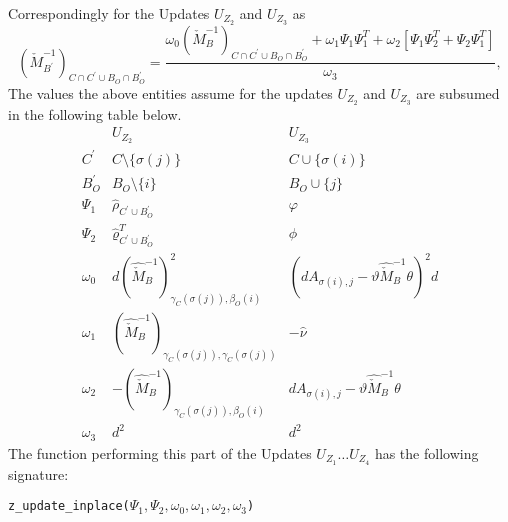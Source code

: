 \documentclass[a4paper]{article}
\begin{document}
Correspondingly for the Updates $U_{Z_{2}}$ and $U_{Z_{3}}$ as 
\begin{equation}
\left(
\check{M}_{B^{\prime}}^{-1}
\right)_{C \cap C^{\prime} \cup B_{O} \cap B_{O}^{\prime}}
=
\frac{
\omega_{0}
\left(
\check{M}_{B}^{-1}
\right)_{C \cap C^{\prime} \cup B_{O} \cap B_{O}^{\prime}}
+\omega_{1}\Psi_{1}\Psi_{1}^{T}
+\omega_{2}\left[\Psi_{1}\Psi_{2}^{T}+\Psi_{2}\Psi_{1}^{T}\right]
}{\omega_{3}},
\end{equation}
The values the above entities assume for the updates $U_{Z_{2}}$ and
$U_{Z_{3}}$ are subsumed in the following table below.
\begin{equation}
\begin{array}{c|cccc}
& U_{Z_{2}} & U_{Z_{3}} \\
\hline
C^{\prime}
& C \setminus \{\sigma(j)\}
& C \cup \{\sigma(i)\}
\\
B_{O}^{\prime}
& B_{O} \setminus \{i\}
& B_{O} \cup \{j\}
\\
\Psi_{1}
& \hat{\rho}_{C^{\prime} \cup B_{O}^{\prime}}
& \varphi
\\
\Psi_{2}
& \hat{\varrho}_{C^{\prime} \cup B_{O}^{\prime}}^{T}
& \phi
\\
\omega_{0}
& d\left(
   \hat{\check{M}}_{B}^{-1}
  \right)_{\gamma_{C}(\sigma(j)), \beta_{O}(i)}^{2}
& \left(
   dA_{\sigma(i),j}-\vartheta\hat{\check{M}}_{B}^{-1}\theta
  \right)^{2} d
\\
\omega_{1}
& \left(
   \hat{\check{M}}_{B}^{-1}
  \right)_{\gamma_{C}(\sigma(j)), \gamma_{C}(\sigma(j))}
& -\hat{\nu}
\\
\omega_{2}
& -\left(
   \hat{\check{M}}_{B}^{-1}
  \right)_{\gamma_{C}(\sigma(j)), \beta_{O}(i)}
& d A_{\sigma(i), j}-\vartheta\hat{\check{M}}_{B}^{-1}\theta
\\
\omega_{3}
& d^{2}
& d^{2}
\end{array}
\end{equation}
The function performing this part of the Updates $U_{Z_{1}} \dots U_{Z_{4}}$
has the following signature:
\begin{tabbing}
\texttt{z\_update\_inplace($\Psi_{1}, \Psi_{2}, \omega_{0}, \omega_{1},
\omega_{2}, \omega_{3}$)}
\end{tabbing}
\end{document}
